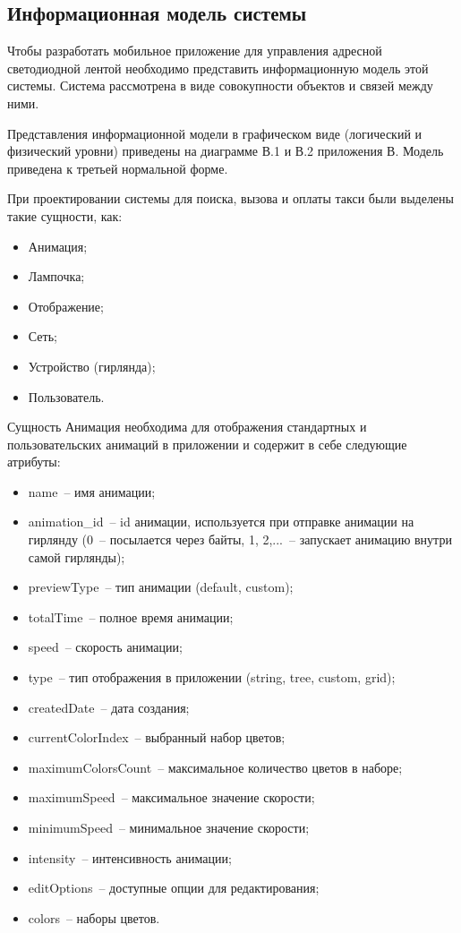 \newpage
\subsection{Информационная модель системы}
\label{sec:develop:umlDiagrams}

Чтобы разработать мобильное приложение для управления адресной светодиодной лентой необходимо представить информационную модель этой системы. Система рассмотрена в виде совокупности объектов и связей между ними. 

Представления информационной модели в графическом виде (логический и физический уровни) приведены на диаграмме В.1 и В.2 приложения В. Модель приведена к третьей нормальной форме.

При проектировании системы для поиска, вызова и оплаты такси были выделены такие сущности, как:
\begin{itemize}
	\item Анимация;
	\item Лампочка;
	\item Отображение;
	\item Сеть;
	\item Устройство (гирлянда);
	\item Пользователь.
\end{itemize}

Сущность Анимация необходима для отображения стандартных и пользовательских анимаций в приложении и содержит в себе следующие атрибуты:
\begin{itemize}
	\item name~-- имя анимации;
	\item animation\_id~-- id анимации, используется при отправке анимации на гирлянду (0~-- посылается через байты, 1, 2,...~-- запускает анимацию внутри самой гирлянды);
	\item previewType~-- тип анимации (default, custom);
	\item totalTime~-- полное время анимации;
	\item speed~-- скорость анимации;
	\item type~-- тип отображения в приложении (string, tree, custom, grid);
	\item createdDate~-- дата создания;
	\item currentColorIndex~-- выбранный набор цветов;
	\item maximumColorsCount~-- максимальное количество цветов в наборе;
	\item maximumSpeed~-- максимальное значение скорости;
	\item minimumSpeed~-- минимальное значение скорости;
	\item intensity~-- интенсивность анимации;
	\item editOptions~-- доступные опции для редактирования;
	\item colors~-- наборы цветов.
\end{itemize}

